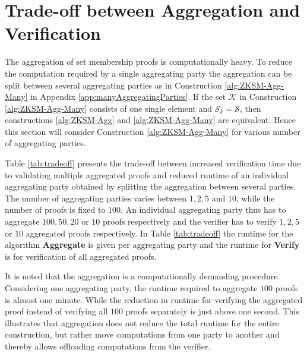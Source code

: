 \section{Trade-off between Aggregation and Verification}
\label{sec:tradeoff}
The aggregation of set membership proofs is computationally heavy. To reduce the computation required by a single aggregating party the aggregation can be split between several aggregating parties as in Construction \ref{alg:ZKSM-Agg-Many} in Appendix \ref{app:manyAggregatingParties}. If the set $\mathcal{K}$ in Construction \ref{alg:ZKSM-Agg-Many} consists of one single element and $\mathcal{S}_k=\mathcal{S}$, then constructions \ref{alg:ZKSM-Agg} and \ref{alg:ZKSM-Agg-Many} are equivalent. Hence this section will consider Construction \ref{alg:ZKSM-Agg-Many} for various number of aggregating parties.

Table \ref{tab:tradeoff} presents the trade-off between increased verification time due to  validating multiple aggregated proofs and reduced runtime of  an individual aggregating party obtained by splitting the aggregation between  several parties. The number of aggregating parties varies between $1,2,5$ and $10$, while the number of proofs is fixed to $100$. An individual aggregating party thus has to aggregate $100,50,20$ or $10$  proofs respectively and the verifier has to verify $1,2,5$ or $10$ aggregated proofs respectively. In Table \ref{tab:tradeoff} the runtime for the algorithm \textbf{Aggregate} is given per aggregating party and the runtime for \textbf{Verify} is for verification of all aggregated proofs. 

It is noted that the aggregation is a computationally demanding procedure. Considering one aggregating party, the runtime required to aggregate $100$ proofs is almost one minute. While the reduction in runtime for verifying the aggregated proof instead of verifying all $100$ proofs separately is just above one second. This illustrates that aggregation does not reduce the total runtime for the entire construction, but rather move computations from one party to another and thereby allows offloading computations from the verifier. 


